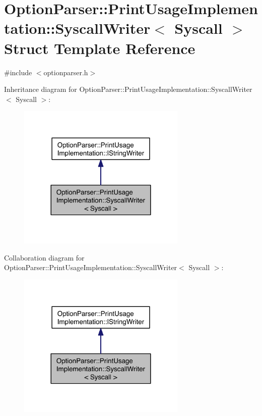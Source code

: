 \hypertarget{struct_option_parser_1_1_print_usage_implementation_1_1_syscall_writer}{\section{Option\-Parser\-:\-:Print\-Usage\-Implementation\-:\-:Syscall\-Writer$<$ Syscall $>$ Struct Template Reference}
\label{struct_option_parser_1_1_print_usage_implementation_1_1_syscall_writer}
}


{\ttfamily \#include $<$optionparser.\-h$>$}



Inheritance diagram for Option\-Parser\-:\-:Print\-Usage\-Implementation\-:\-:Syscall\-Writer$<$ Syscall $>$\-:\nopagebreak
\begin{figure}[H]
\begin{center}
\leavevmode
\includegraphics[width=228pt]{struct_option_parser_1_1_print_usage_implementation_1_1_syscall_writer__inherit__graph}
\end{center}
\end{figure}


Collaboration diagram for Option\-Parser\-:\-:Print\-Usage\-Implementation\-:\-:Syscall\-Writer$<$ Syscall $>$\-:\nopagebreak
\begin{figure}[H]
\begin{center}
\leavevmode
\includegraphics[width=228pt]{struct_option_parser_1_1_print_usage_implementation_1_1_syscall_writer__coll__graph}
\end{center}
\end{figure}
